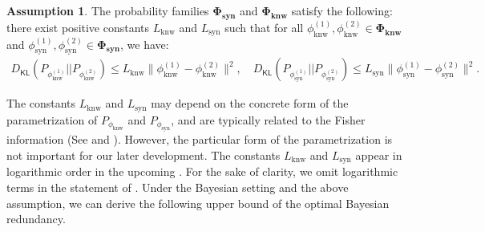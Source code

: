 \documentclass[11pt]{article}
\theoremstyle{plain}
\theoremstyle{definition}
\newtheorem{assumption}[theorem]{Assumption}
\newcommand{\DKL}{D_{\mathsf{KL}}}
\newcommand{\knwModel}{\phi_{\text{knw}}}
\newcommand{\synModel}{\phi_{\text{syn}}}
\newcommand{\knwfamily}{\mathbf{\Phi_{\text{knw}}}}
\newcommand{\synfamily}{\mathbf{\Phi_{\text{syn}}}}
\newcommand{\knwLip}{L_{\text{knw}}}
\newcommand{\synLip}{L_{\text{syn}}}
\newcommand{\Knwelem}{\boldsymbol{\kappa}}
\newcommand{\Synelem}{\boldsymbol{\xi}}
\newcommand{\jian}[1]{{\it \color{red}{Jian: #1}}}
\begin{document}
\begin{assumption}
\label{ass: mutual information}
The probability families $\synfamily$ and $\knwfamily$ satisfy the following: there exist positive constants \( \knwLip \) and \( \synLip \) such that for all \( \knwModel^{(1)}, \knwModel^{(2)} \in \knwfamily \) and \( \synModel^{(1)}, \synModel^{(2)} \in \synfamily \), we have:
\begin{align*}
    \DKL\left(P_{\knwModel^{(1)}}||P_{\knwModel^{(2)}}\right) \leq \knwLip \|\knwModel^{(1)}-\knwModel^{(2)}\|^2, \quad
    \DKL\left(P_{\synModel^{(1)}}||P_{\synModel^{(2)}}\right) \leq \synLip \|\synModel^{(1)}-\synModel^{(2)}\|^2.
\end{align*}
\end{assumption}


The constants $\knwLip$ and $\synLip$ may depend on the concrete form of the parametrization of $P_{\knwModel}$ and $P_{\synModel}$, and are typically related to the Fisher information (See  and ). 
However, the particular form of the parametrization is not important for our later development.
The constants $\knwLip$ and $\synLip$ appear in logarithmic order in the upcoming . For the sake of clarity, we omit logarithmic terms in the statement of . 
Under the Bayesian setting and the above assumption, we can derive the following upper bound of the optimal Bayesian redundancy.
\end{document}
